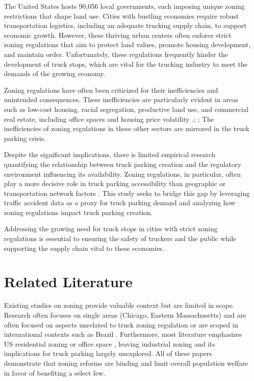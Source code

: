 \documentclass[
  12pt]{article}
\begin{document}
The United States hosts 90,056 local governments, each imposing unique
zoning restrictions that shape land use. Cities with bustling economies
require robust transportation logistics, including an adequate trucking
supply chain, to support economic growth. However, these thriving urban
centers often enforce strict zoning regulations that aim to protect land
values, promote housing development, and maintain order. Unfortunately,
these regulations frequently hinder the development of truck stops,
which are vital for the trucking industry to meet the demands of the
growing economy.

Zoning regulations have often been criticized for their inefficiencies
and unintended consequences. These inefficiencies are particularly
evident in areas such as low-cost housing, racial segregation,
productive land use, and commercial real estate, including office spaces
and housing price volatility
\citet{glaeserImpactBuildingRestrictions2003}.;
\citet{galeReviewColorLaw2019}; \citet{PDFTriumphCity2024} The
inefficiencies of zoning regulations in these other sectors are mirrored
in the truck parking crisis.

Despite the significant implications, there is limited empirical
research quantifying the relationship between truck parking creation and
the regulatory environment influencing its availability. Zoning
regulations, in particular, often play a more decisive role in truck
parking accessibility than geographic or transportation network factors
\citep{shertzerZoningEconomicGeography2018}. This study seeks to bridge
this gap by leveraging traffic accident data as a proxy for truck
parking demand and analyzing how zoning regulations impact truck parking
creation.

Addressing the growing need for truck stops in cities with strict zoning
regulations is essential to ensuring the safety of truckers and the
public while supporting the supply chain vital to these economies.

\section{Related Literature}\label{related-literature}

Existing studies on zoning provide valuable context but are limited in
scope. Research often focuses on single areas (Chicago, Eastern
Massachusetts) and are often focused on aspects unrelated to truck
zoning regulation
\citep{shertzerRaceEthnicityDiscriminatory2016, glaeserCausesConsequencesLand2009}
or are scoped in international contexts such as Brazil
\citep{anagolEstimatingEconomicValue2021}. Furthermore, most literature
emphasizes US residential zoning
\citep{lensStrictLandUse2016, huangResidentialLandUse2012}or office
space \citep{cheshireOfficeSpaceSupply2008}, leaving industrial zoning
and its implications for truck parking largely unexplored. All of these
papers demonstrate that zoning reforms are binding and limit overall
population welfare in favor of benefiting a select few.
\end{document}
